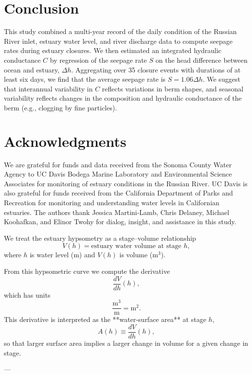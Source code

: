 \documentclass[preprint,12pt,authoryear]{elsarticle}
\begin{document}
\label{sec:discussion}

\section{Conclusion}

This study combined a multi-year record of the daily condition of the Russian River inlet, estuary water level, and river discharge data to compute seepage rates during estuary closures.
We then estimated an integrated hydraulic conductance $C$ by regression of the seepage rate $S$ on the head difference between ocean and estuary, $\Delta h$. 
Aggregating over 35 closure events with durations of at least six days, we find that the average seepage rate is $S = 1.06 \Delta h$.
We suggest that interannual variability in $C$ reflects variations in berm shapes, and seasonal variability reflects changes in the composition and hydraulic conductance of the berm (e.g., clogging by fine particles).


\section{Acknowledgments}
We are grateful for funds and data received from the Sonoma County Water Agency to UC Davis Bodega Marine Laboratory and Environmental Science Associates for monitoring of estuary conditions in the Russian River. UC Davis is also grateful for funds received from the California Department of Parks and Recreation for monitoring and understanding water levels in Californian estuaries. The authors thank Jessica Martini-Lamb, Chris Delaney, Michael Koohafkan, and Elinor Twohy for dialog, insight, and assistance in this study.
 



We treat the estuary hypsometry as a stage–volume relationship
\[
V(h) = \text{estuary water volume at stage } h,
\]
where \(h\) is water level (m) and \(V(h)\) is volume (m\(^3\)).

From this hypsometric curve we compute the derivative
\[
\frac{dV}{dh}(h),
\]
which has units
\[
\frac{\text{m}^3}{\text{m}} = \text{m}^2.
\]
This derivative is interpreted as the **water‐surface area** at stage \(h\),
\[
A(h) \equiv \frac{dV}{dh}(h),
\]
so that larger surface area implies a larger change in volume for a given change in stage.

---
\end{document}
